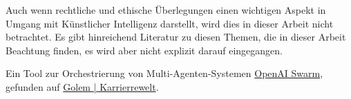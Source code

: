 Auch wenn rechtliche und ethische Überlegungen einen wichtigen Aspekt in Umgang mit Künstlicher Intelligenz darstellt, wird dies in dieser Arbeit nicht betrachtet. Es gibt hinreichend Literatur zu diesen Themen, die in dieser Arbeit Beachtung finden, es wird aber nicht explizit darauf eingegangen.\vspace{0.2cm}

\begin{tcolorbox}[
	enhanced,
	breakable,
	colback=red!5!white,
	colframe=red!75!black!50,
	title= Mein roter Faden: noch was zum Testen
	]
	Ein Tool zur Orchestrierung von Multi-Agenten-Systemen \href{https://community.openai.com/t/introducing-swarm-js-node-js-implementation-of-openai-swarm/977510}{OpenAI Swarm}, gefunden auf \href{https://karrierewelt.golem.de/blogs/karriere-ratgeber/bot-belegschaft-mit-entlastungspotenzial-ki-agenten-fur-den-arbeitsalltag-in-der-testphase-1}{Golem | Karrierrewelt}.
\end{tcolorbox}

